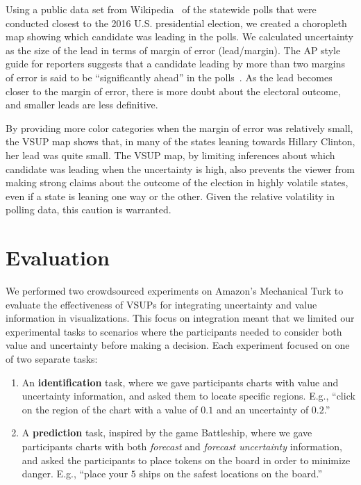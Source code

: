 \pollFig

Using a public data set from Wikipedia~\cite{wiki} of the statewide polls that were conducted closest to the 2016 U.S. presidential election, we created a choropleth map showing which candidate was leading in the polls. We calculated uncertainty as the size of the lead in terms of margin of error (lead/margin). The AP style guide for reporters suggests that a candidate leading by more than two margins of error is said to be ``significantly ahead'' in the polls~\cite{french1988associated}. As the lead becomes closer to the margin of error, there is more doubt about the electoral outcome, and smaller leads are less definitive.

By providing more color categories when the margin of error was relatively small, the VSUP map shows that, in many of the states leaning towards Hillary Clinton, her lead was quite small. The VSUP map, by limiting inferences about which candidate was leading when the uncertainty is high, also prevents the viewer from making strong claims about the outcome of the election in highly volatile states, even if a state is leaning one way or the other. Given the relative volatility in polling data, this caution is warranted.

\section{Evaluation}
\conditionFig

We performed two crowdsourced experiments on Amazon's Mechanical Turk to evaluate the effectiveness of VSUPs for integrating uncertainty and value information in visualizations. This focus on integration meant that we limited our experimental tasks to scenarios where the participants needed to consider both value and uncertainty before making a decision. Each experiment focused on one of two separate tasks:

\begin{enumerate}
	\item An \textbf{identification} task, where we gave participants charts with value and uncertainty information, and asked them to locate specific regions. E.g., ``click on the region of the chart with a value of $0.1$ and an uncertainty of $0.2$.''
	\item A \textbf{prediction} task, inspired by the game Battleship, where we gave participants charts with both \emph{forecast} and \emph{forecast uncertainty} information, and asked the participants to place tokens on the board in order to minimize danger. E.g., ``place your $5$ ships on the safest locations on the board.''
\end{enumerate}


